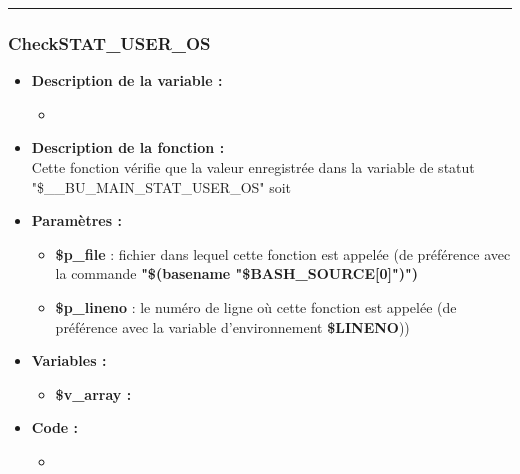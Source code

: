 \documentclass[a4paper,10pt]{article}
\begin{document}
\color{blue}\par\noindent\rule{\textwidth}{0.4pt}\color{white}

\color{blue}
\subsubsection{CheckSTAT\_USER\_OS}\color{white}
\begin{itemize}
    \item \textbf{Description de la variable :}
    \begin{itemize}
        \item \textbf{}\\[1\baselineskip]
    \end{itemize}

    \item \textbf{Description de la fonction :}\\
    Cette fonction vérifie que la valeur enregistrée dans la variable de statut "\$\_\_BU\_MAIN\_STAT\_USER\_OS" soit

    \item \textbf{Paramètres :}
    \begin{itemize}
        \item \color{orange}\textbf{\$p\_file}\color{white} : fichier dans lequel cette fonction est appelée (de préférence avec la commande \textbf{"\$(\color{gray}basename \color{white}"\color{orange}\$BASH\_SOURCE[0]\color{white}")")}\\[1\baselineskip]

        \item \color{orange}\textbf{\$p\_lineno}\color{white} : le numéro de ligne où cette fonction est appelée (de préférence avec la variable d'environnement \textbf{\color{orange}\$LINENO}))\\[1\baselineskip]
    \end{itemize}

    \item \textbf{Variables :}
    \begin{itemize}
        \item \textbf{\color{orange}\$v\_array\color{white} :}\\[1\baselineskip]
    \end{itemize}

    \item \textbf{Code :}
        \begin{itemize}
        \item \textbf{}\\[1\baselineskip]
    \end{itemize}

\end{itemize}
\end{document}
